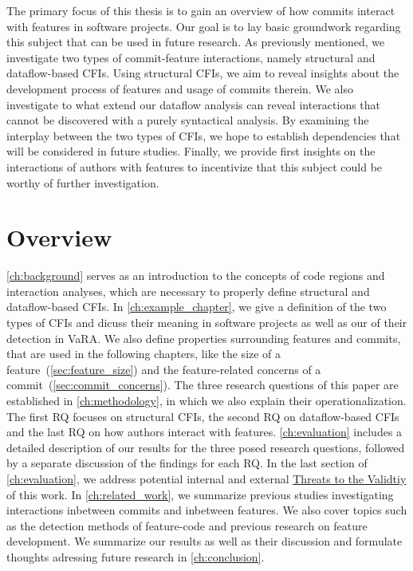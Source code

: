 The primary focus of this thesis is to gain an overview of how commits interact with features in software projects. 
Our goal is to lay basic groundwork regarding this subject that can be used in future research. 
As previously mentioned, we investigate two types of commit-feature interactions, namely structural and dataflow-based CFIs. 
Using structural CFIs, we aim to reveal insights about the development process of features and usage of commits therein. 
We also investigate to what extend our dataflow analysis can reveal interactions that cannot be discovered with a purely syntactical analysis.
By examining the interplay between the two types of CFIs, we hope to establish dependencies that will be considered in future studies.
Finally, we provide first insights on the interactions of authors with features to incentivize that this subject could be worthy of further investigation.

\section{Overview}

\autoref{ch:background} serves as an introduction to the concepts of code regions and interaction analyses, which are necessary to properly define structural and dataflow-based CFIs.
In \autoref{ch:example_chapter}, we give a definition of the two types of CFIs and dicuss their meaning in software projects as well as our  of their detection in VaRA.
We also define properties surrounding features and commits, that are used in the following chapters, like the size of a feature~(\autoref{sec:feature_size}) and the feature-related concerns of a commit~(\autoref{sec:commit_concerns}).
The three research questions of this paper are established in \autoref{ch:methodology}, in which we also explain their operationalization.
The first RQ focuses on structural CFIs, the second RQ on dataflow-based CFIs and the last RQ on how authors interact with features.
\autoref{ch:evaluation} includes a detailed description of our results for the three posed research questions, followed by a separate discussion of the findings for each RQ. %
In the last section of \autoref{ch:evaluation}, we address potential internal and external \hyperref[sec:threats]{Threats to the Validtiy} of this work.
In \autoref{ch:related_work}, we summarize previous studies investigating interactions inbetween commits and inbetween features.
We also cover topics such as the detection methods of feature-code and previous research on feature development. %
We summarize our results as well as their discussion and formulate thoughts adressing future research in \autoref{ch:conclusion}.




